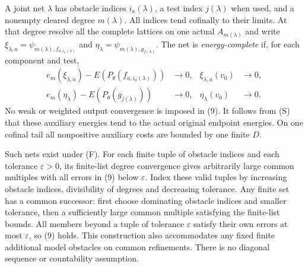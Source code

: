 \documentclass[11pt]{article}
\begin{document}
A joint net $\lambda$ has obstacle indices $i_a(\lambda)$,
a test index $j(\lambda)$ when used, and a nonempty cleared degree
$m(\lambda)$. All indices tend cofinally to their limits.
At that degree resolve all the complete lattices on one actual
$A_{m(\lambda)}$ and write
$\xi_{\lambda,a}=\psi_{m(\lambda),f_{a,i_a(\lambda)}}$ and
$\eta_\lambda=\psi_{m(\lambda),g_{j(\lambda)}}$.
The net is \emph{energy-complete} if, for each component and test,
\[
\begin{aligned}
 e_m(\xi_{\lambda,a})-E(P_\theta(f_{a,i_a(\lambda)}))&\longrightarrow0,
 &\xi_{\lambda,a}(v_0)&\longrightarrow0,\\
 e_m(\eta_\lambda)-E(P_\theta(g_{j(\lambda)}))&\longrightarrow0,
 &\eta_\lambda(v_0)&\longrightarrow0.
\end{aligned}                                           \tag{9}
\]
No weak or weighted output convergence is imposed in (9).
It follows from (S) that these auxiliary energies tend to the
actual original endpoint energies. On one cofinal tail all
nonpositive auxiliary costs are bounded by one finite $D$.

Such nets exist under (F).
For each finite tuple of obstacle indices and each tolerance
$\varepsilon>0$, its finite-list degree convergence gives
arbitrarily large common multiples with all errors in (9) below
$\varepsilon$. Index these valid tuples by increasing obstacle
indices, divisibility of degrees and decreasing tolerance.
Any finite set has a common successor: first choose dominating
obstacle indices and smaller tolerance, then a sufficiently large
common multiple satisfying the finite-list bounds.
All members beyond a tuple of tolerance $\varepsilon$ satisfy
their own errors at most $\varepsilon$, so (9) holds.
This construction also accommodates any fixed finite additional
model obstacles on common refinements.
There is no diagonal sequence or countability assumption.
\end{document}
